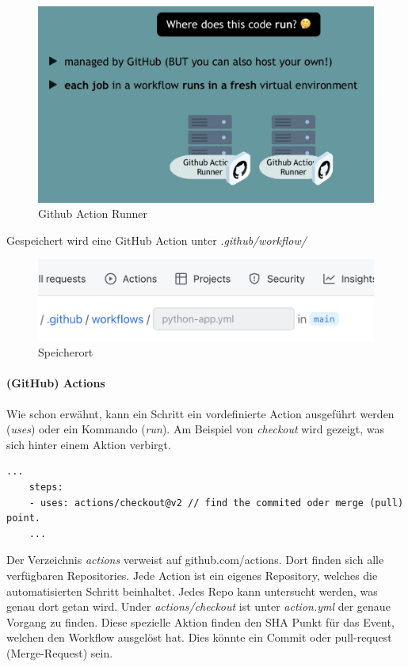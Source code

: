 \begin{figure}[H]
	\centering
	\includegraphics[scale = 0.2]{attachment/chapter_2/Scc101}
	\caption{Github Action Runner}
\end{figure}


Gespeichert wird eine GitHub Action unter \textit{.github/workflow/}

\begin{figure}[H]
	\centering
	\includegraphics[scale = 0.2]{attachment/chapter_2/Scc104}
	\caption{Speicherort}
\end{figure}

\paragraph{(GitHub) Actions}

Wie schon erwähnt, kann ein Schritt ein vordefinierte Action ausgeführt werden (\textit{uses}) oder ein Kommando (\textit{run}). Am Beispiel von \textit{checkout} wird gezeigt, was sich hinter einem Aktion verbirgt.
\begin{lstlisting}[style=Config, caption={GitHub Action: Checkout}, captionpos=b]
	...
	steps:
	- uses: actions/checkout@v2 // find the commited oder merge (pull) point.
	...
\end{lstlisting}
Der Verzeichnis \textit{actions} verweist auf github.com/actions. Dort finden sich alle verfügbaren Repositories. Jede Action ist ein eigenes Repository, welches die automatisierten Schritt beinhaltet. Jedes Repo kann untersucht werden, was genau dort getan wird. Under \textit{actions/checkout} ist unter \textit{action.yml} der genaue Vorgang zu finden. Diese spezielle Aktion finden den SHA Punkt für das Event, welchen den Workflow ausgelöst hat. Dies könnte ein Commit oder pull-request (Merge-Request) sein.

